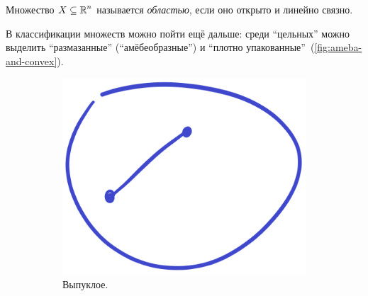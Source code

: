 \documentclass[a4paper,12pt]{article}
\begin{document}
  \begin{definition}
    Множество $X \hm\subseteq \RR^n$ называется \emph{областью}, если оно открыто и линейно связно.
  \end{definition}

  В классификации множеств можно пойти ещё дальше: среди ``цельных'' можно выделить ``размазанные'' (``амёбеобразные'') и ``плотно упакованные''~(\ref{fig:ameba-and-convex}).

  \begin{figure}[ht]
    \centering
    
    \begin{subfigure}[b]{0.3\textwidth}
      \centering
    
      \includegraphics[width=\columnwidth]{convex-example}
    
      \caption{Выпуклое.}
    \end{subfigure}
    \hspace{2em}
    \begin{subfigure}[b]{0.3\textwidth}
      

\end{subfigure}
\end{figure}
\end{document}
